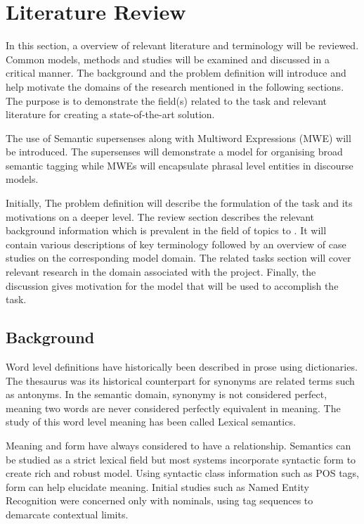 \chapter{Literature Review}\label{chapter2}

In this section, a overview of relevant literature and terminology will be reviewed. Common models, methods and studies will be examined and discussed in a critical manner. The background and the problem definition will introduce and help motivate the domains of the research mentioned in the following sections. The purpose is to demonstrate the field(s) related to the \dimsum task and relevant literature for creating a state-of-the-art solution.

The use of Semantic supersenses along with Multiword Expressions (MWE) will be introduced. The supersenses will demonstrate a model for organising broad semantic tagging while MWEs will encapsulate phrasal level entities in discourse models.

Initially, The problem definition will describe the formulation of the task and its motivations on a deeper level. The review section describes the relevant background information which is prevalent in the field of topics to \dimsum. It will contain various descriptions of key terminology followed by an overview of case studies on the corresponding model domain. The related tasks section will cover relevant research in the domain associated with the project. Finally, the discussion gives motivation for the model that will be used to accomplish the task.

\section{Background}

Word level definitions have historically been described in prose using dictionaries. The thesaurus was its historical counterpart for synonyms are related terms such as antonyms. In the semantic domain, synonymy is not considered perfect, meaning two words are never considered perfectly equivalent in meaning. The study of this word level meaning has been called Lexical semantics.

Meaning and form have always considered to have a relationship. Semantics can be studied as a strict lexical field but most systems incorporate syntactic form to create rich and robust model. Using syntactic class information such as POS tags, form can help elucidate meaning. Initial studies such as Named Entity Recognition were concerned only with nominals, using tag sequences to demarcate contextual limits. 

